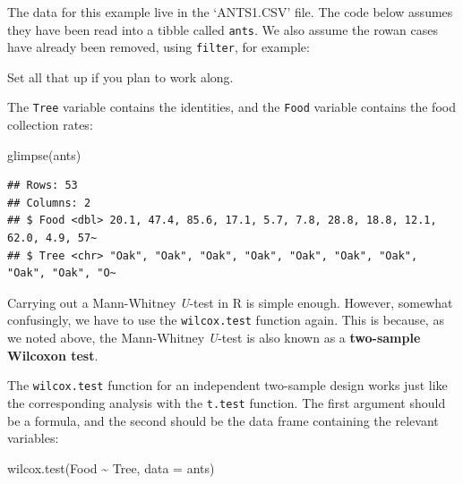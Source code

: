 \documentclass[
]{book}
\newenvironment{Shaded}{\begin{snugshade}}{\end{snugshade}}
\newcommand{\AttributeTok}[1]{\textcolor[rgb]{0.77,0.63,0.00}{#1}}
\newcommand{\FunctionTok}[1]{\textcolor[rgb]{0.00,0.00,0.00}{#1}}
\newcommand{\NormalTok}[1]{#1}
\newcommand{\SpecialCharTok}[1]{\textcolor[rgb]{0.00,0.00,0.00}{#1}}
\newenvironment{greybox}{
  \definecolor{shadecolor}{rgb}{0.95,0.95,0.95}  %
  \color{black}
  \begin{shaded}}
 {\end{shaded}}
\newenvironment{infobox}[1]
  {
  \begin{itemize}
  \renewcommand{\labelitemi}{
    \raisebox{-.7\height}[0pt][0pt]{
      {\setkeys{Gin}{width=3em,keepaspectratio}
        \texttt{[image: images/\#1]}}
    }
  }
  \setlength{\fboxsep}{1em}
  \begin{greybox}
  \item
  }
  {
  \end{greybox}
  \end{itemize}
  }
\begin{document}
\begin{infobox}{action}

\hypertarget{section-21}{%
\subsubsection*{}\label{section-21}}

The data for this example live in the `ANTS1.CSV' file. The code below assumes they have been read into a tibble called \texttt{ants}. We also assume the rowan cases have already been removed, using \texttt{filter}, for example:

Set all that up if you plan to work along.

\end{infobox}

The \texttt{Tree} variable contains the identities, and the \texttt{Food} variable contains the food collection rates:

\begin{Shaded}
\begin{Highlighting}[]
\FunctionTok{glimpse}\NormalTok{(ants)}
\end{Highlighting}
\end{Shaded}

\begin{verbatim}
## Rows: 53
## Columns: 2
## $ Food <dbl> 20.1, 47.4, 85.6, 17.1, 5.7, 7.8, 28.8, 18.8, 12.1, 62.0, 4.9, 57~
## $ Tree <chr> "Oak", "Oak", "Oak", "Oak", "Oak", "Oak", "Oak", "Oak", "Oak", "O~
\end{verbatim}

Carrying out a Mann-Whitney \emph{U}-test in R is simple enough. However, somewhat confusingly, we have to use the \texttt{wilcox.test} function again. This is because, as we noted above, the Mann-Whitney \emph{U}-test is also known as a \textbf{two-sample Wilcoxon test}.

The \texttt{wilcox.test} function for an independent two-sample design works just like the corresponding analysis with the \texttt{t.test} function. The first argument should be a formula, and the second should be the data frame containing the relevant variables:

\begin{Shaded}
\begin{Highlighting}[]
\FunctionTok{wilcox.test}\NormalTok{(Food }\SpecialCharTok{\textasciitilde{}}\NormalTok{ Tree, }\AttributeTok{data =}\NormalTok{ ants)}
\end{Highlighting}
\end{Shaded}
\end{document}
